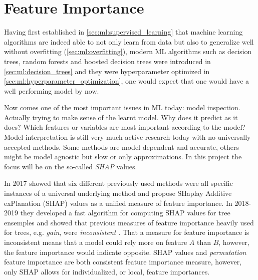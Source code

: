 \documentclass[a4paper, twoside, nobib]{tufte-book}
\newcommand{\autocite}[1]{\citep{#1}}
\begin{document}
\section{Feature Importance}
\label{sec:ml:feature_importance}
Having first established in \autoref{sec:ml:supervised_learning} that machine learning algorithms are indeed able to not only learn from data but also to generalize well without overfitting (\autoref{sec:ml:overfitting}), modern ML algorithms such as decision trees, random forests and boosted decision trees were introduced in \autoref{sec:ml:decision_trees} and they were hyperparameter optimized in \autoref{sec:ml:hyperparameter_optimization}, one would expect that one would have a well performing model by now. 

Now comes one of the most important issues in ML today: model inspection. Actually trying to make sense of the learnt model. Why does it predict as it does? Which features or variables are most important according to the model? Model interpretation is still very much active research today with no universally accepted methods. Some methods are model dependent and accurate, others might be model agnostic but slow or only approximations. In this project the focus will be on the so-called \emph{SHAP} values. 

In 2017 \citet{Lundberg:2017} showed that six different previously used methods were all specific instances of a universal underlying method and propose SHaplay Additive exPlanation (SHAP) values as a unified measure of feature importance. In 2018-2019 they developed a fast algorithm for computing SHAP values for tree ensemples and showed that previous measures of feature importance heavily used for trees, e.g. \emph{gain}, were \emph{inconsistent} \autocite{lundbergConsistentIndividualizedFeature2019}. That a measure for feature importance is inconsistent means that a model could rely more on feature $A$ than $B$, however, the feature importance would indicate opposite. SHAP values and \emph{permutation} feature importance are both consistent feature importance measure, however, only SHAP allows for individualized, or local, feature importances.  
\end{document}
